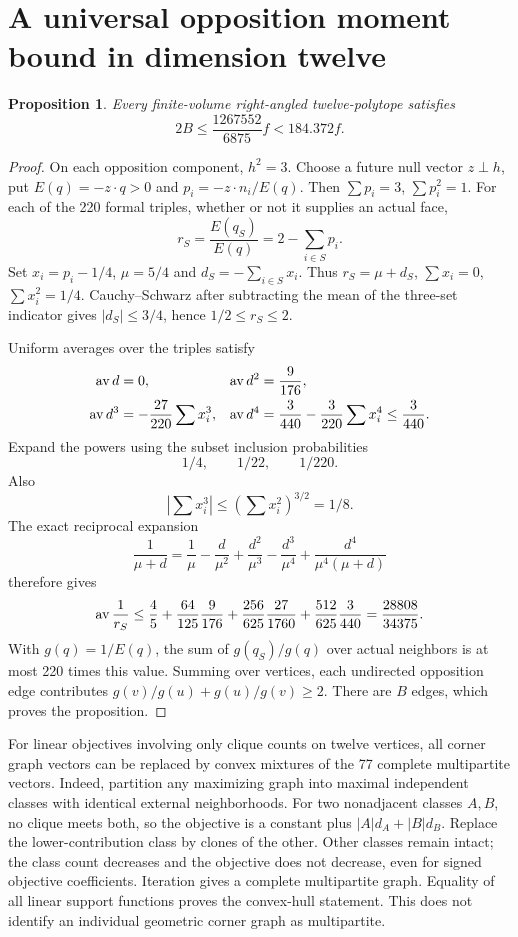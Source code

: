 \documentclass[11pt]{article}
\newtheorem{proposition}[theorem]{Proposition}
\begin{document}
\section{A universal opposition moment bound in dimension twelve}
\begin{proposition}\label{prop:moment}
Every finite-volume right-angled twelve-polytope satisfies
\[
 2B\le\frac{1267552}{6875}f<184.372f.
\]
\end{proposition}
\begin{proof}
On each opposition component, $h^2=3$. Choose a future null vector
$z\perp h$, put $E(q)=-z\cdot q>0$ and $p_i=-z\cdot n_i/E(q)$.
Then $\sum p_i=3$, $\sum p_i^2=1$. For each of the 220 formal triples,
whether or not it supplies an actual face,
\[
 r_S=\frac{E(q_S)}{E(q)}=2-\sum_{i\in S}p_i.
\]
Set $x_i=p_i-1/4$, $\mu=5/4$ and $d_S=-\sum_{i\in S}x_i$.
Thus $r_S=\mu+d_S$, $\sum x_i=0$, $\sum x_i^2=1/4$.
Cauchy--Schwarz after subtracting the mean of the three-set indicator
gives $|d_S|\le3/4$, hence $1/2\le r_S\le2$.

Uniform averages over the triples satisfy
\begin{align*}
 \mathop{\rm av} d&=0,&
 \mathop{\rm av} d^2&=\frac9{176},\\
 \mathop{\rm av} d^3&=-\frac{27}{220}\sum x_i^3,&
 \mathop{\rm av} d^4&=\frac3{440}-\frac3{220}\sum x_i^4\le\frac3{440}.
\end{align*}
Expand the powers using the subset inclusion probabilities
\[
 1/4,\qquad 1/22,\qquad 1/220.
\]
Also
\[
 |\sum x_i^3|\le(\sum x_i^2)^{3/2}=1/8.
\]
The exact reciprocal expansion
\[
 \frac1{\mu+d}=\frac1\mu-\frac d{\mu^2}+\frac{d^2}{\mu^3}
 -\frac{d^3}{\mu^4}+\frac{d^4}{\mu^4(\mu+d)}
\]
therefore gives
\[
 \mathop{\rm av}\frac1{r_S}
 \le\frac45+\frac{64}{125}\frac9{176}
 +\frac{256}{625}\frac{27}{1760}
 +\frac{512}{625}\frac3{440}
 =\frac{28808}{34375}.
\]
With $g(q)=1/E(q)$, the sum of $g(q_S)/g(q)$ over actual neighbors is
at most 220 times this value. Summing over vertices, each undirected
opposition edge contributes $g(v)/g(u)+g(u)/g(v)\ge2$. There are $B$
edges, which proves the proposition.
\end{proof}

For linear objectives involving only clique counts on twelve vertices,
all corner graph vectors can be replaced by convex mixtures of the
77 complete multipartite vectors. Indeed, partition any maximizing graph
into maximal independent classes with identical external neighborhoods.
For two nonadjacent classes $A,B$, no clique meets both, so the objective
is a constant plus $|A|d_A+|B|d_B$. Replace the lower-contribution class
by clones of the other. Other classes remain intact; the class count
decreases and the objective does not decrease, even for signed objective
coefficients. Iteration gives a complete multipartite graph. Equality
of all linear support functions proves the convex-hull statement.
This does not identify an individual geometric corner graph as multipartite.
\end{document}
